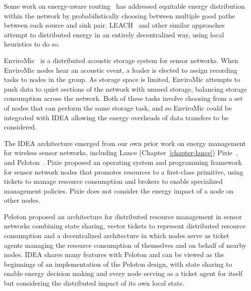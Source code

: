 Some work on energy-aware routing~\cite{ShahRabaey2002,381685} has addressed
equitable energy distribution within the network by probabilistically
choosing between multiple good paths between each source and sink pair.
LEACH~\cite{leach} and other similar approaches attempt to distributed energy
in an entirely decentralized way, using local heuristics to do so.

EnviroMic~\cite{enviromic} is a distributed acoustic storage system for
sensor networks. When EnviroMic nodes hear an acoustic event, a leader is
elected to assign recording tasks to nodes in the group. As storage space is
limited, EnviroMic attempts to push data to quiet sections of the network
with unused storage, balancing storage consumption across the network. Both
of these tasks involve choosing from a set of nodes that can perform the same
storage task, and so EnviroMic could be integrated with IDEA allowing the
energy overheads of data transfers to be considered.

The IDEA architecture emerged from our own prior work on energy management
for wireless sensor networks, including Lance (Chapter~\ref{chapter-lance})
Pixie~\cite{pixie-sensys08}, and Peloton~\cite{peloton-hotos09}.  Pixie
proposed an operating system and programming framework for sensor network
nodes that promotes resources to a first-class primitive, using tickets to
manage resource consumption and brokers to enable specialized management
policies. Pixie does not consider the energy impact of a node on other nodes.

Peloton proposed an architecture for distributed resource management in
sensor networks combining state sharing, vector tickets to represent
distributed resource consumption and a decentralized architecture in which
nodes serve as ticket agents managing the resource consumption of themselves
and on behalf of nearby nodes. IDEA shares many features with Peloton and can
be viewed as the beginnings of an implementation of the Peloton design, with
state sharing to enable energy decision making and every node serving as a
ticket agent for itself but considering the distributed impact of its own
local state.
